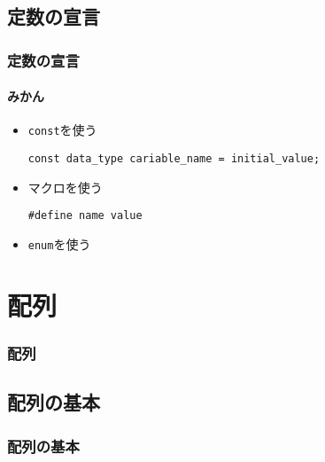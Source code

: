 \documentclass[dvipdfmx]{beamer}
\begin{document}
\subsection{定数の宣言}
\begin{frame}[c, fragile, label=55]
    \frametitle{定数の宣言}
    \framesubtitle{みかん}
    \begin{itemize}
        \item \texttt{const}を使う
            \begin{lstlisting}[gobble=16, caption=Syntax]
                const data_type cariable_name = initial_value;
            \end{lstlisting}
        \item マクロを使う
            \begin{lstlisting}[gobble=16, caption=Syntax]
                #define name value
            \end{lstlisting}
        \item \texttt{enum}を使う
    \end{itemize}
    \vfill \hfill 
    \hyperlink{54}{}
    \space
    \hyperlink{56}{}
\end{frame}

\section{配列}
\begin{frame}[label=56]
    \frametitle{配列}
    \tableofcontents[sections={2,10}]
    \vfill \hfill 
    \hyperlink{55}{}
    \space
    \hyperlink{57}{}
\end{frame}

\subsection{配列の基本}
\begin{frame}[t, fragile, label=57]
    \frametitle{配列の基本}
    \vfill \hfill 
    \hyperlink{56}{}
    \space
    \hyperlink{58}{}
\end{frame}
\end{document}
